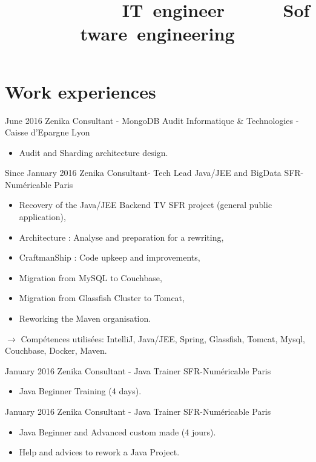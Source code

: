 \documentclass[11pt,a4paper]{moderncv}
\title{\mbox{~~~~~~~~~~~~IT engineer}\newline\mbox{~~~~~~Software engineering}} %
\begin{document}
\maketitle

\section{Work experiences}

\cventry
{June 2016}
{Zenika Consultant - MongoDB Audit}
{Informatique \& Technologies - Caisse d'Epargne}
{Lyon}
{}
{\begin{itemize}
\item Audit and Sharding architecture design. 
\end{itemize}
}   %

\cventry
{Since January 2016}
{Zenika Consultant- Tech Lead Java/JEE and BigData}
{SFR-Numéricable}
{Paris}
{}
{\begin{itemize}
\item Recovery of the Java/JEE Backend TV SFR project (general public application),
\item Architecture : Analyse and preparation for a rewriting,
\item CraftmanShip : Code upkeep and improvements,
\item Migration from MySQL to Couchbase,
\item Migration from Glassfish Cluster to Tomcat,
\item Reworking the Maven organisation.
\end{itemize}
$\rightarrow$ Compétences utilisées: IntelliJ, Java/JEE, Spring, Glassfish, Tomcat, Mysql, Couchbase, Docker, Maven.
}   %

\cventry
{January 2016}
{Zenika Consultant - Java Trainer}
{SFR-Numéricable}
{Paris}
{}
{\begin{itemize}
\item Java Beginner Training (4 days).
\end{itemize}
}   %

\cventry
{January 2016}
{Zenika Consultant - Java Trainer}
{SFR-Numéricable}
{Paris}
{}
{\begin{itemize}
\item Java Beginner and Advanced custom made (4 jours).
\item Help and advices to rework a Java Project.
\end{itemize}
}   %
\end{document}
